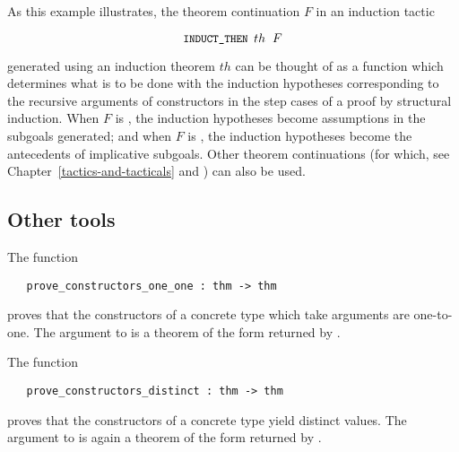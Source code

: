 As this example illustrates, the theorem continuation $F$ in
an induction tactic

\[ \ml{INDUCT\_THEN }th\;\;F \]

\noindent generated using an induction theorem $th$ can be thought of as a
function which determines what is to be done with the induction hypotheses
corresponding to the recursive arguments of constructors in the step
cases of a proof by structural induction.  When $F$ is ,
the induction hypotheses become assumptions in the subgoals generated; and when
$F$ is , the induction hypotheses become the antecedents of
implicative subgoals.  Other theorem continuations (for which, see
Chapter~\ref{tactics-and-tacticals} and \REFERENCE) can also be used.

\subsection{Other tools}


The function

\begin{boxed}
\begin{verbatim}
   prove_constructors_one_one : thm -> thm
\end{verbatim}\end{boxed}

\noindent proves that the constructors
 of a concrete type which take arguments
are one-to-one.  The argument to  is a
theorem of the form returned by .

The function

\begin{boxed}
\begin{verbatim}
   prove_constructors_distinct : thm -> thm
\end{verbatim}\end{boxed}

\noindent proves that the constructors
 of a concrete type yield distinct values.  The argument to
 is again
a theorem of the form returned by .

